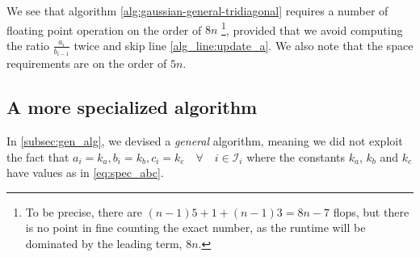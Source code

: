 \documentclass[a4paper]{article}
\begin{document}
We see that algorithm \ref{alg:gaussian-general-tridiagonal} requires a number of floating point operation on the order of $8n$ \footnote{To be precise, there are $(n-1)5 + 1 + (n-1)3 = 8n-7$ flops, but there is no point in fine counting the exact number, as the runtime will be dominated by the leading term, $8n$.}, provided that we avoid computing the ratio $\frac{a_i}{b_{i-1}}$ twice and skip line \ref{alg_line:update_a}.
We also note that the space requirements are on the order of $5n$.

\subsection{A more specialized algorithm}
In \ref{subsec:gen_alg}, we devised a \emph{general} algorithm, meaning we did not exploit the fact that $a_i=k_a, b_i=k_b, c_i=k_c \quad \forall \quad i \in \mathcal{I}_i$ where the constants $k_a$, $k_b$ and $k_c$ have values as in  \eqref{eq:spec_abc}.
\end{document}
